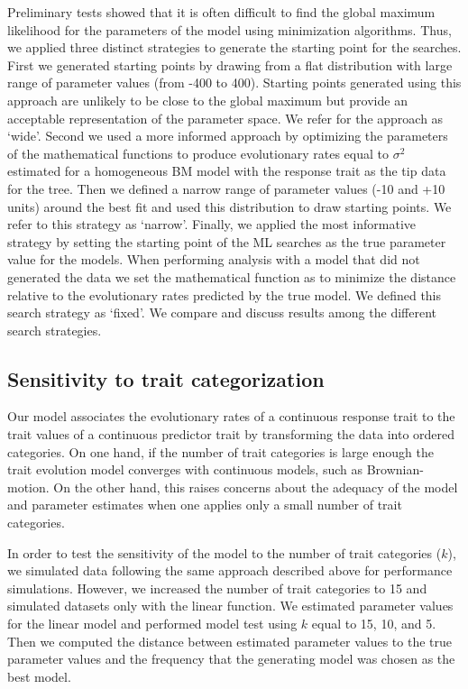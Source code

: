 Preliminary tests showed that it is often difficult to find the global maximum likelihood for the parameters of the model using minimization algorithms. Thus, we applied three distinct strategies to generate the starting point for the searches. First we generated starting points by drawing from a flat distribution with large range of parameter values (from -400 to 400). Starting points generated using this approach are unlikely to be close to the global maximum but provide an acceptable representation of the parameter space. We refer for the approach as `wide'. Second we used a more informed approach by optimizing the parameters of the mathematical functions to produce evolutionary rates equal to $\sigma^{2}$ estimated for a homogeneous BM model with the response trait as the tip data for the tree. Then we defined a narrow range of parameter values (-10 and +10 units) around the best fit and used this distribution to draw starting points. We refer to this strategy as `narrow'. Finally, we applied the most informative strategy by setting the starting point of the ML searches as the true parameter value for the models. When performing analysis with a model that did not generated the data we set the mathematical function as to minimize the distance relative to the evolutionary rates predicted by the true model. We defined this search strategy as `fixed'. We compare and discuss results among the different search strategies.

\subsection{Sensitivity to trait categorization}

Our model associates the evolutionary rates of a continuous response trait to the trait values of a continuous predictor trait by transforming the data into ordered categories. On one hand, if the number of trait categories is large enough the trait evolution model converges with continuous models, such as Brownian-motion. On the other hand, this raises concerns about the adequacy of the model and parameter estimates when one applies only a small number of trait categories.

In order to test the sensitivity of the model to the number of trait categories ($\mathit{k}$), we simulated data following the same approach described above for performance simulations. However, we increased the number of trait categories to 15 and simulated datasets only with the linear function. We estimated parameter values for the linear model and performed model test using $\mathit{k}$ equal to 15, 10, and 5. Then we computed the distance between estimated parameter values to the true parameter values and the frequency that the generating model was chosen as the best model.


